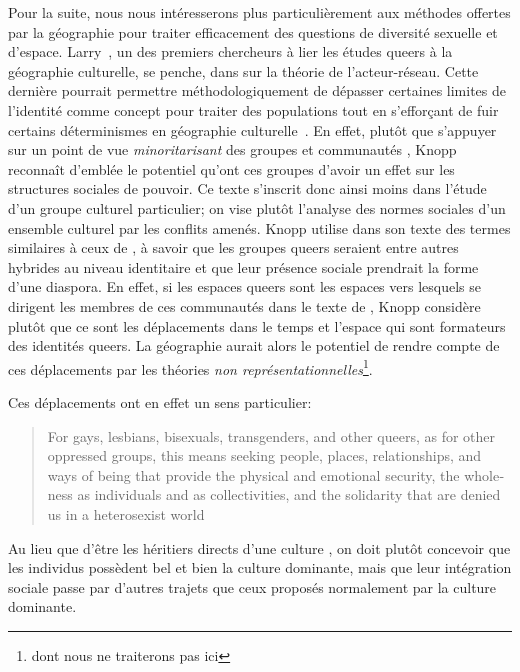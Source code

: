 Pour la suite, nous nous intéresserons plus particulièrement aux méthodes offertes par la géographie pour traiter efficacement des questions de diversité sexuelle et d'espace. 
Larry~\citet{Knopp2004}, un des premiers chercheurs à lier les études queers à la géographie culturelle, se penche, dans  sur la théorie de l'acteur-réseau. 
Cette dernière pourrait permettre méthodologiquement de dépasser certaines limites de l'identité comme concept pour traiter des populations \lgbt{} tout en s’efforçant de fuir certains déterminismes en géographie culturelle~\citep{Knopp2004}. 
En effet, plutôt que s'appuyer sur un point de vue \emph{minoritarisant} des groupes et communautés \lgbt{}, Knopp reconnaît d'emblée le potentiel qu'ont ces groupes d'avoir un effet sur les structures sociales de pouvoir. 
Ce texte s'inscrit donc ainsi moins dans l'étude d'un groupe culturel particulier; on vise plutôt l'analyse des normes sociales d'un ensemble culturel par les conflits amenés. 
Knopp utilise dans son texte des termes similaires à ceux de \citet{Sinfield1996}, à savoir que les groupes queers seraient entre autres hybrides au niveau identitaire et que leur présence sociale prendrait la forme d'une diaspora. 
En effet, si les espaces queers sont les espaces vers lesquels se dirigent les membres de ces communautés dans le texte de \citet{Sinfield1996}, Knopp considère plutôt que ce sont les déplacements dans le temps et l'espace qui sont formateurs des identités queers.
La géographie aurait alors le potentiel de rendre compte de ces déplacements par les théories \emph{non représentationnelles}\footnote{dont nous ne traiterons pas ici}.

Ces déplacements ont en effet un sens particulier: \foreignblockquote{english}[{\cite[123]{Knopp2004}}][.]{For gays, lesbians, bisexuals, transgenders, and other queers, as for other oppressed groups, this means seeking people, places, relationships, and ways of being that provide the physical and emotional security, the wholeness as individuals and as collectivities, and the solidarity that are denied us in a heterosexist world}
Au lieu que d'être les héritiers directs d'une culture \qu{}, on doit plutôt concevoir que les individus \qus{} possèdent bel et bien la culture dominante, mais que leur intégration sociale passe par d'autres trajets que ceux proposés normalement par la culture dominante.

